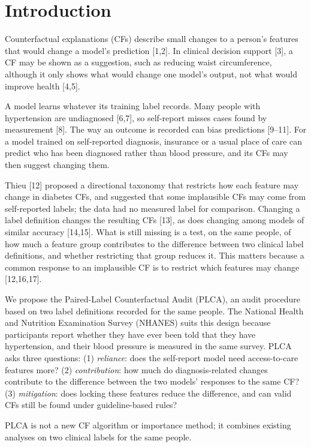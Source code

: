 \documentclass[final,5p,times,twocolumn]{elsarticle}
\begin{document}
\section{Introduction}

Counterfactual explanations (CFs) describe small changes to a person's
features that would change a model's prediction {[}1,2{]}. In clinical
decision support {[}3{]}, a CF may be shown as a suggestion, such as
reducing waist circumference, although it only shows what would change
one model's output, not what would improve health {[}4,5{]}.

A model learns whatever its training label records. Many people with
hypertension are undiagnosed {[}6,7{]}, so self-report misses cases
found by measurement {[}8{]}. The way an outcome is recorded can bias
predictions {[}9--11{]}. For a model trained on self-reported diagnosis,
insurance or a usual place of care can predict who has been diagnosed
rather than blood pressure, and its CFs may then suggest changing them.

Thieu {[}12{]} proposed a directional taxonomy that restricts how each
feature may change in diabetes CFs, and suggested that some implausible
CFs may come from self-reported labels; the data had no measured label
for comparison. Changing a label definition changes the resulting CFs
{[}13{]}, as does changing among models of similar accuracy {[}14,15{]}.
What is still missing is a test, on the same people, of how much a
feature group contributes to the difference between two clinical label
definitions, and whether restricting that group reduces it. This matters
because a common response to an implausible CF is to restrict which
features may change {[}12,16,17{]}.

We propose the Paired-Label Counterfactual Audit (PLCA), an audit
procedure based on two label definitions recorded for the same people.
The National Health and Nutrition Examination Survey (NHANES) suits this
design because participants report whether they have ever been told that
they have hypertension, and their blood pressure is measured in the same
survey. PLCA asks three questions: (1) \emph{reliance}: does the
self-report model need access-to-care features more? (2)
\emph{contribution}: how much do diagnosis-related changes contribute to
the difference between the two models' responses to the same CF? (3)
\emph{mitigation}: does locking these features reduce the difference,
and can valid CFs still be found under guideline-based rules?

PLCA is not a new CF algorithm or importance method; it combines
existing analyses on two clinical labels for the same people.
\end{document}
